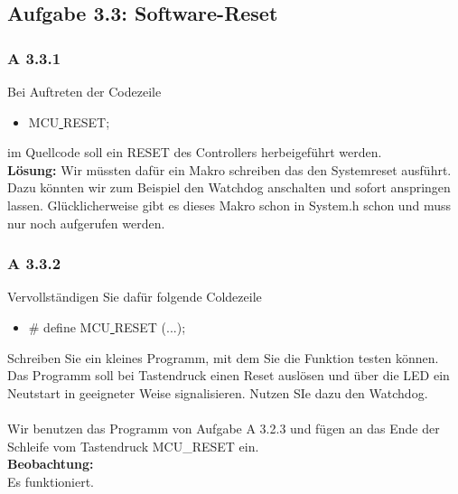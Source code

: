 \subsection*{Aufgabe 3.3: Software-Reset}

\subsubsection*{A 3.3.1}
	Bei Auftreten der Codezeile
	\begin{itemize}
		\item MCU\underline{ }RESET;
	\end{itemize}
	im Quellcode soll ein RESET des Controllers herbeigeführt werden.\\

	\textbf{Lösung:}
		Wir müssten dafür ein Makro schreiben das den Systemreset ausführt. Dazu könnten wir zum Beispiel den Watchdog anschalten und sofort 
		anspringen lassen. Glücklicherweise gibt es dieses Makro schon in System.h schon und muss nur noch aufgerufen werden.
\subsubsection*{A 3.3.2}
	Vervollständigen Sie dafür folgende Coldezeile
	\begin{itemize}
		\item \# define MCU\underline{ }RESET (...);
	\end{itemize}
	Schreiben Sie ein kleines Programm, mit dem Sie die Funktion testen können. Das Programm soll bei Tastendruck einen Reset auslösen und über die LED ein Neutstart in geeigneter Weise signalisieren. Nutzen SIe dazu den Watchdog.\\

	\\
	Wir benutzen das Programm von Aufgabe A 3.2.3 und fügen an das Ende der Schleife vom Tastendruck MCU_RESET ein.\\
	\textbf{Beobachtung:}\\
	Es funktioniert.
	